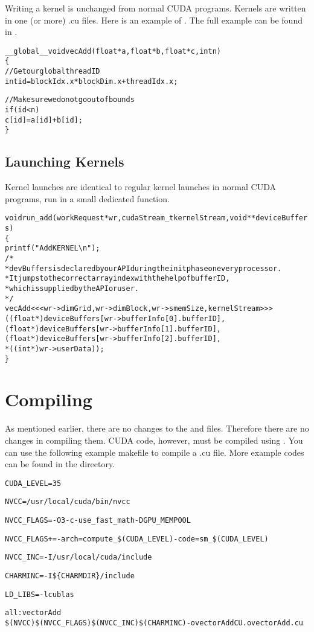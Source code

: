 Writing a kernel is unchanged from normal CUDA programs.
Kernels are written in one (or more) .cu files.
Here is an example of .
The full example can be found in .

\begin{alltt}
__global__ void vecAdd(float *a, float *b, float *c, int n)
\{
    // Get our global thread ID
    int id = blockIdx.x * blockDim.x + threadIdx.x;

    // Make sure we do not go out of bounds
    if (id < n)
        c[id] = a[id] + b[id];
\}
\end{alltt}

\subsection{Launching Kernels}

Kernel launches are identical to regular kernel launches in normal CUDA
programs, run in a small dedicated function.

\begin{alltt}
void run_add(workRequest *wr, cudaStream_t kernelStream, void **deviceBuffers)
\{
    printf("Add KERNEL \textbackslash{n}");
/*
 *  devBuffers is declared by our API during the init phase on every processor.
 *  It jumps to the correct array index with the help of bufferID, 
 *  which is supplied by the API or user.
 */
    vecAdd<<< wr->dimGrid, wr->dimBlock, wr->smemSize, kernelStream>>>
        ((float *) deviceBuffers[wr->bufferInfo[0].bufferID],
         (float *) deviceBuffers[wr->bufferInfo[1].bufferID],
         (float *) deviceBuffers[wr->bufferInfo[2].bufferID],
         *((int *) wr->userData));
\}
\end{alltt}

\section{Compiling}

As mentioned earlier, there are no changes to the  and 
files. Therefore there are no changes in compiling them.
CUDA code, however, must be compiled using .
You can use the following example makefile to compile a .cu file.
More example codes can be found in the  directory.

\begin{alltt}
CUDA_LEVEL=35

NVCC = /usr/local/cuda/bin/nvcc

NVCC_FLAGS = -O3 -c -use_fast_math -DGPU_MEMPOOL

NVCC_FLAGS += -arch=compute_\$(CUDA_LEVEL) -code=sm_\$(CUDA_LEVEL)

NVCC_INC = -I/usr/local/cuda/include

CHARMINC = -I\$\{CHARMDIR\}/include

LD_LIBS= -lcublas

all: vectorAdd
\qquad\$(NVCC) \$(NVCC_FLAGS) \$(NVCC_INC) \$(CHARMINC) -o vectorAddCU.o vectorAdd.cu
\end{alltt}

